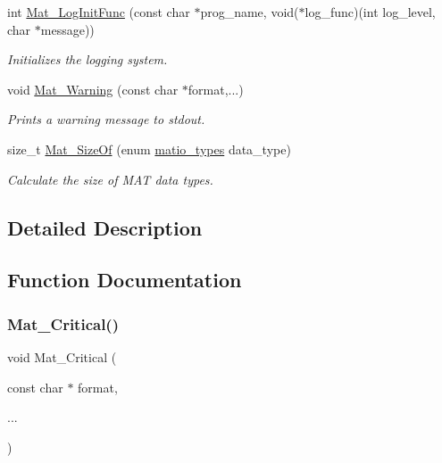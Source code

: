 \begin{DoxyCompactItemize}
int \hyperlink{group__mat__util_ga93f4dd8d36413ae7f49260d757e3ab9f}{Mat\+\_\+\+Log\+Init\+Func} (const char $\ast$prog\+\_\+name, void($\ast$log\+\_\+func)(int log\+\_\+level, char $\ast$message))
\begin{DoxyCompactList}\small\item\em Initializes the logging system. \end{DoxyCompactList}\item 
void \hyperlink{group__mat__util_gafcedc83eb7e4759a8ea5c974c4f801c3}{Mat\+\_\+\+Warning} (const char $\ast$format,...)
\begin{DoxyCompactList}\small\item\em Prints a warning message to stdout. \end{DoxyCompactList}\item 
size\+\_\+t \hyperlink{group__mat__util_gab6774aabdc124c540c1e7686d0804940}{Mat\+\_\+\+Size\+Of} (enum \hyperlink{group___m_a_t_gacf7b3b879282b7ab3a51190e49bf3453}{matio\+\_\+types} data\+\_\+type)
\begin{DoxyCompactList}\small\item\em Calculate the size of M\+AT data types. \end{DoxyCompactList}\end{DoxyCompactItemize}


\subsection{Detailed Description}


\subsection{Function Documentation}
\mbox{\label{group__mat__util_gaf51f2bfbb5580f575e4dd79757e2b80c}} 
\subsubsection{\texorpdfstring{Mat\+\_\+\+Critical()}{Mat\_Critical()}}
{\footnotesize\ttfamily void Mat\+\_\+\+Critical (\begin{DoxyParamCaption}\item[{const char $\ast$}]{format,  }\item[{}]{... }\end{DoxyParamCaption})}




